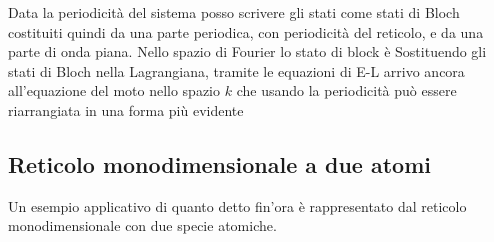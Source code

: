 Data la periodicità del sistema posso scrivere gli stati come stati di Bloch costituiti quindi da una parte periodica, con periodicità del reticolo, e da una parte di onda piana. Nello spazio di Fourier lo stato di block è
Sostituendo gli stati di Bloch nella Lagrangiana, tramite le equazioni di E-L arrivo ancora all'equazione del moto nello spazio $k$
che usando la periodicità può essere riarrangiata in una forma più evidente
\subsection{Reticolo monodimensionale a due atomi}
Un esempio applicativo di quanto detto fin'ora è rappresentato dal reticolo monodimensionale con due specie atomiche.

